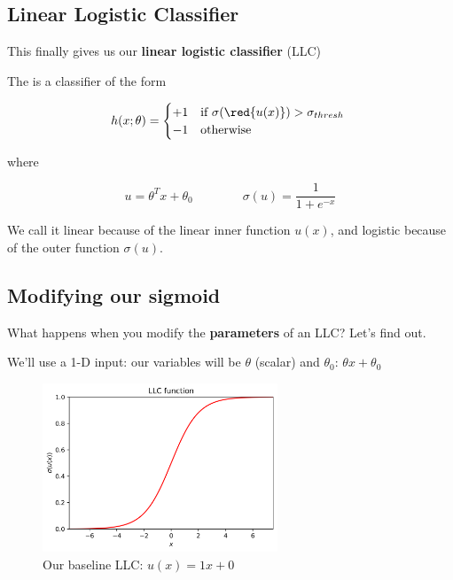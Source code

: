     \subsection{Linear Logistic Classifier}
        
        This finally gives us our \textbf{linear logistic classifier} (LLC)\\
        
        \begin{kequation}
            The  is a  classifier of the form
            
            \begin{equation*}
                h(x; \theta) = 
                \begin{cases}
                    +1 & \text{if $\sigma(\red{u(x)})>\sigma_{thresh}$ }\\
                    -1 & \text{otherwise}
                \end{cases}
            \end{equation*}
            
            where 
            
            \begin{equation}
                u=\theta^T x + \theta_0   \qquad\qquad \sigma(u) = \frac{1}{1+e^{-x}}
            \end{equation}
            
            We call it linear because of the linear inner function $u(x)$, and logistic because of the outer function $\sigma(u)$.
        \end{kequation}
        
    \subsection{Modifying our sigmoid}
    
        What happens when you modify the \textbf{parameters} of an LLC? Let's find out.
        
        We'll use a 1-D input: our variables will be $\theta$ (scalar) and $\theta_0$: $\theta x + \theta_0$
        
        \begin{figure}[H]
            \centering
            \includegraphics[width=70mm,scale=0.5]{images/classification_images/llc_func.png}
            \caption*{Our baseline LLC: $u(x)=1x+0 $}
        \end{figure}
        
